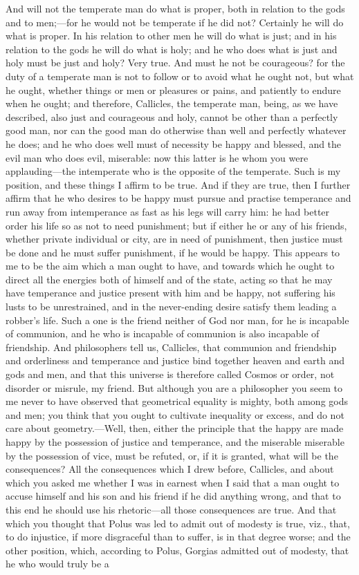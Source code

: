 \documentclass[11pt,letter]{article}
\begin{document}
\par  And will not the temperate man do what is proper, both in relation to the gods and to men;—for he would not be temperate if he did not? Certainly he will do what is proper. In his relation to other men he will do what is just; and in his relation to the gods he will do what is holy; and he who does what is just and holy must be just and holy? Very true. And must he not be courageous? for the duty of a temperate man is not to follow or to avoid what he ought not, but what he ought, whether things or men or pleasures or pains, and patiently to endure when he ought; and therefore, Callicles, the temperate man, being, as we have described, also just and courageous and holy, cannot be other than a perfectly good man, nor can the good man do otherwise than well and perfectly whatever he does; and he who does well must of necessity be happy and blessed, and the evil man who does evil, miserable: now this latter is he whom you were applauding—the intemperate who is the opposite of the temperate. Such is my position, and these things I affirm to be true. And if they are true, then I further affirm that he who desires to be happy must pursue and practise temperance and run away from intemperance as fast as his legs will carry him: he had better order his life so as not to need punishment; but if either he or any of his friends, whether private individual or city, are in need of punishment, then justice must be done and he must suffer punishment, if he would be happy. This appears to me to be the aim which a man ought to have, and towards which he ought to direct all the energies both of himself and of the state, acting so that he may have temperance and justice present with him and be happy, not suffering his lusts to be unrestrained, and in the never-ending desire satisfy them leading a robber’s life. Such a one is the friend neither of God nor man, for he is incapable of communion, and he who is incapable of communion is also incapable of friendship. And philosophers tell us, Callicles, that communion and friendship and orderliness and temperance and justice bind together heaven and earth and gods and men, and that this universe is therefore called Cosmos or order, not disorder or misrule, my friend. But although you are a philosopher you seem to me never to have observed that geometrical equality is mighty, both among gods and men; you think that you ought to cultivate inequality or excess, and do not care about geometry.—Well, then, either the principle that the happy are made happy by the possession of justice and temperance, and the miserable miserable by the possession of vice, must be refuted, or, if it is granted, what will be the consequences? All the consequences which I drew before, Callicles, and about which you asked me whether I was in earnest when I said that a man ought to accuse himself and his son and his friend if he did anything wrong, and that to this end he should use his rhetoric—all those consequences are true. And that which you thought that Polus was led to admit out of modesty is true, viz., that, to do injustice, if more disgraceful than to suffer, is in that degree worse; and the other position, which, according to Polus, Gorgias admitted out of modesty, that he who would truly be a 
\end{document}
